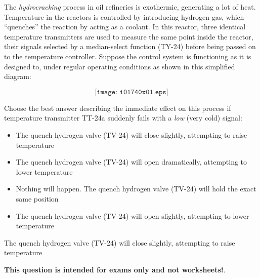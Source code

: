 

The {\it hydrocracking} process in oil refineries is exothermic, generating a lot of heat.  Temperature in the reactors is controlled by introducing hydrogen gas, which ``quenches'' the reaction by acting as a coolant.  In this reactor, three identical temperature transmitters are used to measure the same point inside the reactor, their signals selected by a median-select function (TY-24) before being passed on to the temperature controller.  Suppose the control system is functioning as it is designed to, under regular operating conditions as shown in this simplified diagram:

$$\texttt{[image: i01740x01.eps]}$$

\noindent
Choose the best answer describing the immediate effect on this process if temperature transmitter TT-24a suddenly fails with a {\it low} (very cold) signal:

\begin{itemize}
\item{} The quench hydrogen valve (TV-24) will close slightly, attempting to raise temperature
\vskip 10pt
\item{} The quench hydrogen valve (TV-24) will open dramatically, attempting to lower temperature
\vskip 10pt
\item{} Nothing will happen.  The quench hydrogen valve (TV-24) will hold the exact same position
\vskip 10pt
\item{} The quench hydrogen valve (TV-24) will open slightly, attempting to lower temperature 
\end{itemize}







The quench hydrogen valve (TV-24) will close slightly, attempting to raise temperature







{\bf This question is intended for exams only and not worksheets!}.




